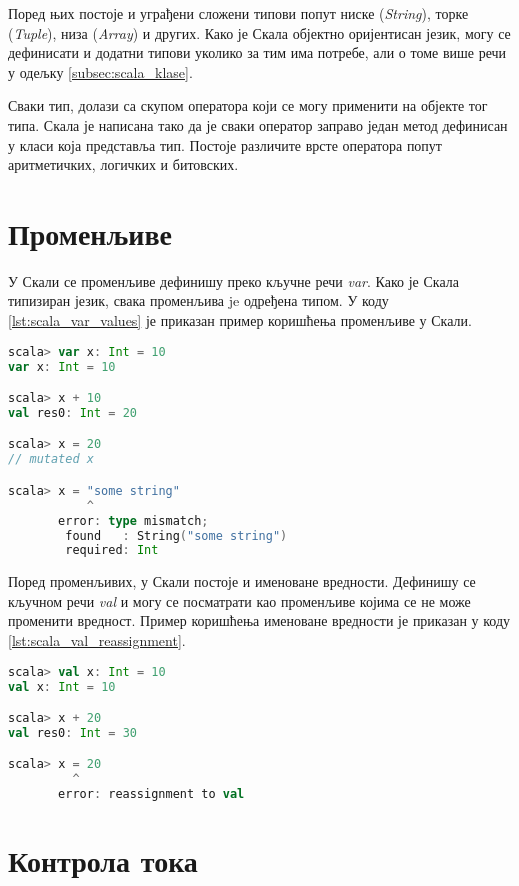 \documentclass[12pt,oneside]{memoir}
\begin{document}
Поред њих постоје и уграђени сложени типови попут ниске (\textit{String}), торке (\textit{Tuple}), низа (\textit{Array}) и других. Како је Скала објектно оријентисан језик, могу се дефинисати и додатни типови уколико за тим има потребе, али о томе више речи у одељку \ref{subsec:scala_klase}.

Сваки тип, долази са скупом оператора који се могу применити на објекте тог типа. Скала је написана тако да је сваки оператор заправо један метод дефинисан у класи која представља тип. Постоје различите врсте оператора попут аритметичких, логичких и битовских.

\section{Променљиве}
\label{sec:scala_prom}

У Скали се променљиве дефинишу преко кључне речи \textit{var}. Како је Скала типизиран језик, свака променљива je одређена типом. У коду \ref{lst:scala_var_values} је приказан пример коришћења променљиве у Скали.

\begin{lstlisting}[language=Scala, caption={Променљиве у Скали}, label={lst:scala_var_values}, basicstyle=\small]
scala> var x: Int = 10
var x: Int = 10

scala> x + 10
val res0: Int = 20

scala> x = 20
// mutated x

scala> x = "some string"
           ^
       error: type mismatch;
        found   : String("some string")
        required: Int
\end{lstlisting}

Поред променљивих, у Скали постоје и именоване вредности. Дефинишу се кључном речи \textit{val} и могу се посматрати као променљиве којима се не може променити вредност. Пример коришћења именоване вредности је приказан у коду \ref{lst:scala_val_reassignment}.

\begin{lstlisting}[language=Scala, caption={Именоване вредности у Скали}, label={lst:scala_val_reassignment}, basicstyle=\small]
scala> val x: Int = 10
val x: Int = 10

scala> x + 20
val res0: Int = 30

scala> x = 20
         ^
       error: reassignment to val
\end{lstlisting}

\section{Контрола тока}
\label{sec:scala_kontr_toka}
\end{document}
